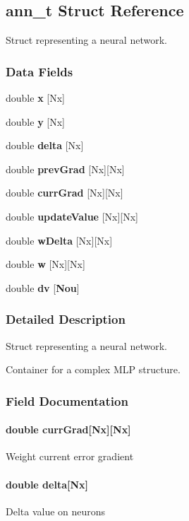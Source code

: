 \subsection{ann\+\_\+t Struct Reference}
\label{structann__t}


Struct representing a neural network.  


\subsubsection*{Data Fields}
\begin{DoxyCompactItemize}
\item 
double {\bf x} [Nx]
\item 
double {\bf y} [Nx]
\item 
double {\bf delta} [Nx]
\item 
double {\bf prev\+Grad} [Nx][Nx]
\item 
double {\bf curr\+Grad} [Nx][Nx]
\item 
double {\bf update\+Value} [Nx][Nx]
\item 
double {\bf w\+Delta} [Nx][Nx]
\item 
double {\bf w} [Nx][Nx]
\item 
double {\bf dv} [{\bf Nou}]
\end{DoxyCompactItemize}


\subsubsection{Detailed Description}
Struct representing a neural network. 

Container for a complex M\+L\+P structure. 

\subsubsection{Field Documentation}
\paragraph[{curr\+Grad}]{\setlength{\rightskip}{0pt plus 5cm}double curr\+Grad[Nx][Nx]}\label{structann__t_ad634fb273a77c89ef50752fe62499b4f}
Weight current error gradient 
\paragraph[{delta}]{\setlength{\rightskip}{0pt plus 5cm}double delta[Nx]}\label{structann__t_a610000125df6a3004a1a0768bee350be}
Delta value on neurons 
